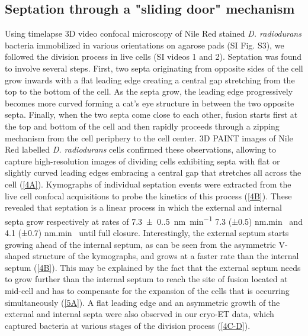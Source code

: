 \subsection{Septation through a "sliding door" mechanism}

Using timelapse 3D video confocal microscopy of Nile Red stained \textit{D. radiodurans} bacteria immobilized in various orientations on agarose pads (SI Fig. S3), we followed the division process in live cells (SI videos 1 and 2).
Septation was found to involve several steps.
First, two septa originating from opposite sides of the cell grow inwards with a flat leading edge creating a central gap stretching from the top to the bottom of the cell.
As the septa grow, the leading edge progressively becomes more curved forming a cat's eye structure in between the two opposite septa.
Finally, when the two septa come close to each other, fusion starts first at the top and bottom of the cell and then rapidly proceeds through a zipping mechanism from the cell periphery to the cell center.
3D PAINT images of Nile Red labelled \textit{D. radiodurans} cells confirmed these observations, allowing to capture high-resolution images of dividing cells exhibiting septa with flat or slightly curved leading edges embracing a central gap that stretches all across the cell (\autoref{4A}).
Kymographs of individual septation events were extracted from the live cell confocal acquisitions to probe the kinetics of this process (\autoref{4B}).
These revealed that septation is a linear process in which the external and internal septa grow respectively at rates of \qty{7.3(0.5)}{nm.min^{-1}} 7.3 (±0.5) nm.min~\cite{-1} and 4.1 (±0.7) nm.min~\cite{-1} until full closure.
Interestingly, the external septum starts growing ahead of the internal septum, as can be seen from the asymmetric V-shaped structure of the kymographs, and grows at a faster rate than the internal septum (\autoref{4B}).
This may be explained by the fact that the external septum needs to grow further than the internal septum to reach the site of fusion located at mid-cell and has to compensate for the expansion of the cells that is occurring simultaneously (\autoref{5A}).
A flat leading edge and an asymmetric growth of the external and internal septa were also observed in our cryo-ET data, which captured bacteria at various stages of the division process (\autoref{4C-D}).

